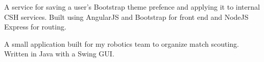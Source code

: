 \documentclass[10pt,a4paper]{altacv}
\begin{document}
A service for saving a user's Bootstrap theme prefence and applying it to internal CSH services.
Built using AngularJS and Bootstrap for front end and NodeJS Express for routing.

\divider

A small application built for my robotics team to organize match scouting.
Written in Java with a Swing GUI.

\clearpage
\end{document}
